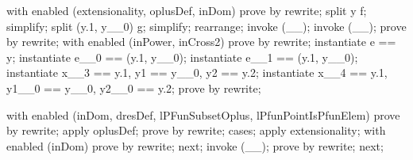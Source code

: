 \begin{LPScript}\begin{forget}[lPFunSubsetOplus]
    with enabled (extensionality, oplusDef, inDom) prove by rewrite;
    split y \in f;
    simplify;
    split \lnot  (y.1, y\_\_0) \in  g;
    simplify;
    rearrange;
    invoke (\_\pfun \_);
    invoke (\_\rel \_);
    prove by rewrite;
    with enabled (inPower, inCross2) prove by rewrite;
    instantiate e == y;
    instantiate e\_\_0 == (y.1, y\_\_0);
    instantiate e\_\_1 == (y.1, y\_\_0);
    instantiate x\_\_3 == y.1, y1 == y\_\_0, y2 == y.2;
    instantiate x\_\_4 == y.1, y1\_\_0 == y\_\_0, y2\_\_0 == y.2;
    prove by rewrite;
\end{forget}\end{LPScript}

\begin{LPScript}\begin{forget}[lPFunElemAbsorbsUnitOplusRight]
    with enabled (inDom, dresDef, lPFunSubsetOplus, lPfunPointIsPfunElem)
        prove by rewrite;
    apply oplusDef;
    prove by rewrite;
    cases;
      apply extensionality;
      with enabled (inDom) prove by rewrite;
    next;
      invoke (\_\rel \_);
      prove by rewrite;
    next;
\end{forget}\end{LPScript}

